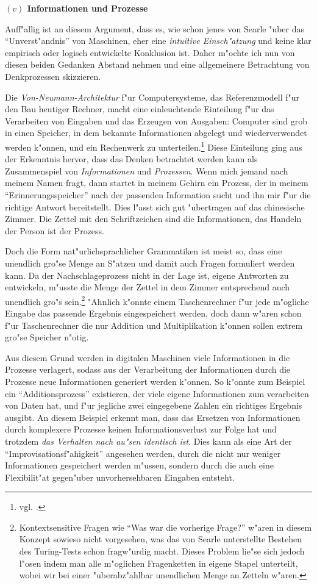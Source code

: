 \documentclass[a4paper, emulatestandardclasses, 12pt]{scrartcl}
\begin{document}
\begin{onehalfspace}
\vspace{5mm}
\noindent\textbf{$(v)$ Informationen und Prozesse}

\noindent Auff"allig ist an diesem Argument, dass es, wie schon jenes von Searle "uber das "`Unverst"andnis"' von Maschinen, eher eine \emph{intuitive Einsch"atzung} und keine klar empirisch oder logisch entwickelte Konklusion ist. Daher m"ochte ich nun von diesen beiden Gedanken Abstand nehmen und eine allgemeinere Betrachtung von Denkprozessen skizzieren.

Die \emph{Von-Neumann-Architektur} f"ur Computersysteme, das Referenzmodell f"ur den Bau heutiger Rechner, macht eine einleuchtende Einteilung f"ur das Verarbeiten von Eingaben und das Erzeugen von Ausgaben: Computer sind grob in einen Speicher, in dem bekannte Informationen abgelegt und wiederverwendet werden k"onnen, und ein Rechenwerk zu unterteilen.\footnote{vgl. \cite{von1993first}.} Diese Einteilung ging aus der Erkenntnis hervor, dass das Denken betrachtet werden kann als Zusammenspiel von \emph{Informationen} und \emph{Prozessen}. Wenn mich jemand nach meinem Namen fragt, dann startet in meinem Gehirn ein Prozess, der in meinem "`Erinnerungsspeicher"' nach der passenden Information sucht und ihn mir f"ur die richtige Antwort bereitstellt. Dies l"asst sich gut "ubertragen auf das chinesische Zimmer. Die Zettel mit den Schriftzeichen sind die Informationen, das Handeln der Person ist der Prozess. 

Doch die Form nat"urlichsprachlicher Grammatiken ist meist so, dass eine unendlich gro"se Menge an S"atzen und damit auch Fragen formuliert werden kann. Da der Nachschlageprozess nicht in der Lage ist, eigene Antworten zu entwickeln, m"usste die Menge der Zettel in dem Zimmer entsprechend auch unendlich gro"s sein.\footnote{Kontextsensitive Fragen wie "`Was war die vorherige Frage?"' w"aren in diesem Konzept sowieso nicht vorgesehen, was das von Searle unterstellte Bestehen des Turing-Tests schon fragw"urdig macht. Dieses Problem lie"se sich jedoch l"osen indem man alle m"oglichen Fragenketten in eigene Stapel unterteilt, wobei wir bei einer "uberabz"ahlbar unendlichen Menge an Zetteln w"aren.} "Ahnlich k"onnte einem Taschenrechner f"ur jede m"ogliche Eingabe das passende Ergebnis eingespeichert werden, doch dann w"aren schon f"ur Taschenrechner die nur Addition und Multiplikation k"onnen sollen extrem gro"se Speicher n"otig. 

Aus diesem Grund werden in digitalen Maschinen viele Informationen in die Prozesse verlagert, sodass aus der Verarbeitung der Informationen durch die Prozesse neue Informationen generiert werden k"onnen. So k"onnte zum Beispiel ein "`Additionsprozess"' existieren, der viele eigene Informationen zum verarbeiten von Daten hat, und f"ur jegliche zwei eingegebene Zahlen ein richtiges Ergebnis ausgibt. An diesem Beispiel erkennt man, dass das Ersetzen von Informationen durch komplexere Prozesse keinen Informationsverlust zur Folge hat und trotzdem \emph{das Verhalten nach au"sen identisch ist}. Dies kann als eine Art der "`Improvisationsf"ahigkeit"' angesehen werden, durch die nicht nur weniger Informationen gespeichert werden m"ussen, sondern durch die auch eine Flexibilit"at gegen"uber unvorhersehbaren Eingaben entsteht. 


\end{onehalfspace}
\end{document}
